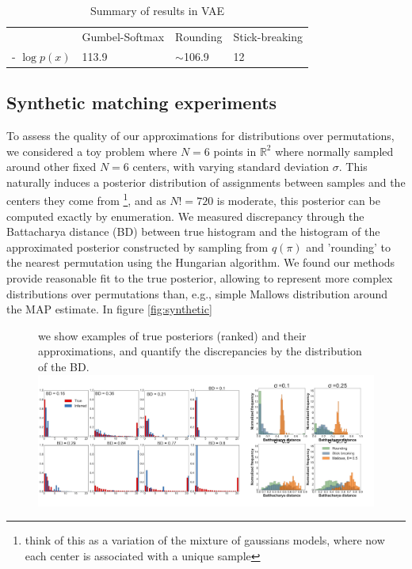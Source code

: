 \documentclass{article}
\begin{document}
\begin{table}[t]
  \caption{Summary of results in VAE}
  \label{sample-table}
  \centering
  \begin{tabular}{llll}

    \midrule

    & Gumbel-Softmax    & Rounding & Stick-breaking\\
    \cmidrule{2-4}
    - $\log p(x)$ & 113.9  & $\sim$106.9  & 12    \\
        \bottomrule
  \end{tabular}
\end{table}


 \subsection{Synthetic matching experiments}
To assess the quality of our approximations for distributions over permutations, we considered a toy problem where $N=6$ points in $\mathbb{R}^2$ where normally sampled around other fixed $N=6$ centers, with varying standard deviation $\sigma$. This naturally induces a posterior distribution of assignments between samples and the centers they come from \footnote{think of this as a variation of the mixture of gaussians models, where now each center is associated with a unique sample}, and as $N!=720$ is moderate, this posterior can be computed exactly by enumeration. We measured discrepancy through the Battacharya distance (BD) between true histogram and the histogram of the approximated posterior constructed by sampling from $q(\pi)$ and 'rounding' to the nearest permutation using the Hungarian algorithm. We found our methods provide reasonable fit to the true posterior, allowing to represent more complex distributions over permutations than, e.g., simple Mallows distribution around the MAP estimate. In figure \ref{fig:synthetic}\begin{figure}[t] we show examples of true posteriors (ranked) and their approximations, and quantify the discrepancies by the distribution of the BD.
  \centering
  \includegraphics[width=1.0\textwidth]{../figures/figure5.pdf} 
  \caption{}
\label{fig:VAE}
\end{figure}
\end{document}
